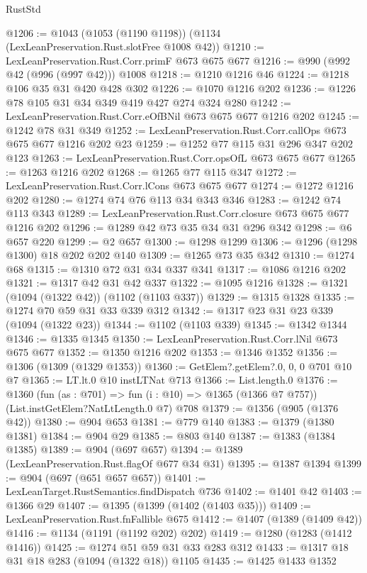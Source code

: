 \begin{lexlean}{RustStd}
\begin{coremodule}
{\begin{coremodule}
{{{{{{{{{@1206 := @1043 (@1053 (@1190 @1198)) (@1134 (LexLeanPreservation.Rust.slotFree @1008 @42))
@1210 := LexLeanPreservation.Rust.Corr.primF @673 @675 @677
@1216 := @990 (@992 @42 (@996 (@997 @42))) @1008
@1218 := @1210 @1216 @46
@1224 := @1218 @106 @35 @31 @420 @428 @302
@1226 := @1070 @1216 @202
@1236 := @1226 @78 @105 @31 @34 @349 @419 @427 @274 @324 @280
@1242 := LexLeanPreservation.Rust.Corr.eOfBNil @673 @675 @677 @1216 @202
@1245 := @1242 @78 @31 @349
@1252 := LexLeanPreservation.Rust.Corr.callOps @673 @675 @677 @1216 @202 @23
@1259 := @1252 @77 @115 @31 @296 @347 @202 @123
@1263 := LexLeanPreservation.Rust.Corr.opsOfL @673 @675 @677
@1265 := @1263 @1216 @202
@1268 := @1265 @77 @115 @347
@1272 := LexLeanPreservation.Rust.Corr.lCons @673 @675 @677
@1274 := @1272 @1216 @202
@1280 := @1274 @74 @76 @113 @34 @343 @346
@1283 := @1242 @74 @113 @343
@1289 := LexLeanPreservation.Rust.Corr.closure @673 @675 @677 @1216 @202
@1296 := @1289 @42 @73 @35 @34 @31 @296 @342
@1298 := @6 @657 @220
@1299 := @2 @657
@1300 := @1298 @1299
@1306 := @1296 (@1298 @1300) @18 @202 @202 @140
@1309 := @1265 @73 @35 @342
@1310 := @1274 @68
@1315 := @1310 @72 @31 @34 @337 @341
@1317 := @1086 @1216 @202
@1321 := @1317 @42 @31 @42 @337
@1322 := @1095 @1216
@1328 := @1321 (@1094 (@1322 @42)) (@1102 (@1103 @337))
@1329 := @1315 @1328
@1335 := @1274 @70 @59 @31 @33 @339 @312
@1342 := @1317 @23 @31 @23 @339 (@1094 (@1322 @23))
@1344 := @1102 (@1103 @339)
@1345 := @1342 @1344
@1346 := @1335 @1345
@1350 := LexLeanPreservation.Rust.Corr.lNil @673 @675 @677
@1352 := @1350 @1216 @202
@1353 := @1346 @1352
@1356 := @1306 (@1309 (@1329 @1353))
@1360 := GetElem?.getElem?.{0, 0, 0} @701 @10 @7
@1365 := LT.lt.{0} @10 instLTNat @713
@1366 := List.length.{0}
@1376 := @1360
    (fun (as : @701) => fun (i : @10) => @1365 (@1366 @7 @757))
    (List.instGetElem?NatLtLength.{0} @7)
    @708
@1379 := @1356 (@905 (@1376 @42))
@1380 := @904 @653
@1381 := @779 @140
@1383 := @1379 (@1380 @1381)
@1384 := @904 @29
@1385 := @803 @140
@1387 := @1383 (@1384 @1385)
@1389 := @904 (@697 @657)
@1394 := @1389 (LexLeanPreservation.Rust.flagOf @677 @34 @31)
@1395 := @1387 @1394
@1399 := @904 (@697 (@651 @657 @657))
@1401 := LexLeanTarget.RustSemantics.findDispatch @736
@1402 := @1401 @42
@1403 := @1366 @29
@1407 := @1395 (@1399 (@1402 (@1403 @35)))
@1409 := LexLeanPreservation.Rust.fnFallible @675
@1412 := @1407 (@1389 (@1409 @42))
@1416 := @1134 (@1191 (@1192 @202) @202)
@1419 := @1280 (@1283 (@1412 @1416))
@1425 := @1274 @51 @59 @31 @33 @283 @312
@1433 := @1317 @18 @31 @18 @283 (@1094 (@1322 @18)) @1105
@1435 := @1425 @1433 @1352
}}}}}}}}}
\end{coremodule}}
\end{coremodule}
\end{lexlean}

